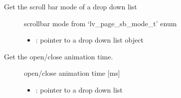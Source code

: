 \documentclass[letterpaper,10pt,english]{sphinxmanual}
\begin{document}

\begin{fulllineitems}
\label{\detokenize{object-types/ddlist:_CPPv421lv_ddlist_get_sb_modePK8lv_obj_t}}%
\pysigstartmultiline
{}\label{\detokenize{object-types/ddlist:lv__ddlist_8h_1a7084b0b1cd0e19c9d13e7b66c1394c6d}}%
\pysigstopmultiline
Get the scroll bar mode of a drop down list \begin{description}
\item[{}] \leavevmode
scrollbar mode from ‘lv\_page\_sb\_mode\_t’ enum 

\item[{}] \leavevmode\begin{itemize}
\item {} 
: pointer to a drop down list object 

\end{itemize}

\end{description}


\end{fulllineitems}


\begin{fulllineitems}
\label{\detokenize{object-types/ddlist:_CPPv423lv_ddlist_get_anim_timePK8lv_obj_t}}%
\pysigstartmultiline
{}\label{\detokenize{object-types/ddlist:lv__ddlist_8h_1afbba676c7aa354072b86f45cd26edf13}}%
\pysigstopmultiline
Get the open/close animation time. \begin{description}
\item[{}] \leavevmode
open/close animation time {[}ms{]} 

\item[{}] \leavevmode\begin{itemize}
\item {} 
: pointer to a drop down list 

\end{itemize}

\end{description}


\end{fulllineitems}
\end{document}
